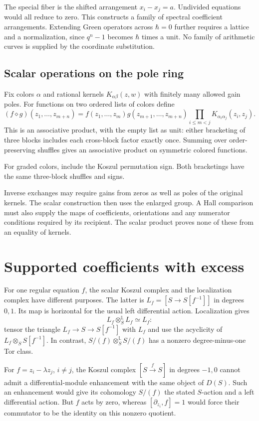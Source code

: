The special fiber is the shifted arrangement $x_i-x_j=a$.
Undivided equations would all reduce to zero. This constructs a
family of spectral coefficient arrangements. Extending Green
operators across $\hbar=0$ further requires a lattice and a
normalization, since $q^n-1$ becomes $\hbar$ times a unit.
No family of arithmetic curves is supplied by the coordinate
substitution.

\subsection{Scalar operations on the pole ring}

Fix colors $\alpha$ and rational kernels
$K_{\alpha\beta}(z,w)$ with finitely many allowed gain poles.
For functions on two ordered lists of colors define
\[
 (f\diamond g)(z_1,\ldots,z_{m+n})
 =f(z_1,\ldots,z_m)g(z_{m+1},\ldots,z_{m+n})
   \prod_{i\leq m<j}K_{\alpha_i\alpha_j}(z_i,z_j).
\]
This is an associative product, with the empty list as unit:
either bracketing of three blocks includes each cross-block
factor exactly once. Summing over order-preserving shuffles
gives an associative product on symmetric colored functions.

For graded colors, include the Koszul permutation sign.
Both bracketings have the same three-block shuffles and signs.

Inverse exchanges may require gains from zeros as well as poles
of the original kernels. The scalar construction then uses the
enlarged group. A Hall comparison must also supply the maps of
coefficients, orientations and any numerator conditions required
by its recipient. The scalar product proves none of these from
an equality of kernels.

\section{Supported coefficients with excess}
\label{v4-arith:curve:sec:supported}

For one regular equation $f$, the scalar Koszul complex and the
localization complex have different purposes. The latter is
$L_f=[S\to S[f^{-1}]]$ in degrees $0,1$.
Its map is horizontal for the usual left differential action.
Localization gives
\[
 L_f\otimes_S^{\mathbb L}L_f\simeq L_f:
\]
tensor the triangle $L_f\to S\to S[f^{-1}]$ with $L_f$ and use
the acyclicity of $L_f\otimes_SS[f^{-1}]$.
In contrast, $S/(f)\otimes_S^{\mathbb L}S/(f)$ has a nonzero
degree-minus-one Tor class.

For $f=z_i-\lambda z_j$, $i\ne j$, the Koszul complex
$[S\xrightarrow{f}S]$ in degrees $-1,0$ cannot admit a
differential-module enhancement with the same object of $D(S)$.
Such an enhancement would give its cohomology $S/(f)$ the stated
$S$-action and a left differential action. But $f$ acts by zero,
whereas $[\partial_{z_i},f]=1$ would force their commutator to
be the identity on this nonzero quotient.

